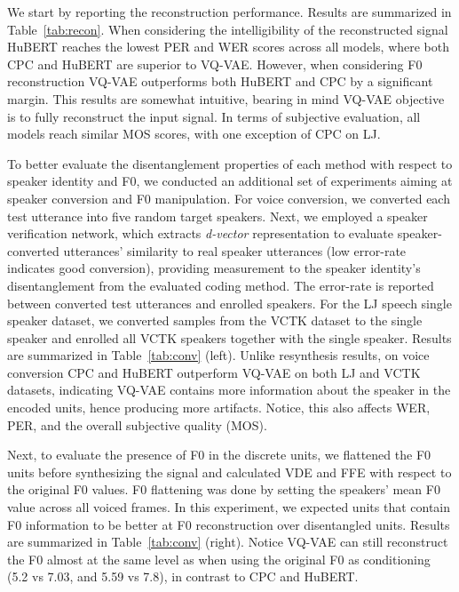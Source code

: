 {}
We start by reporting the reconstruction performance. Results are summarized in Table~\ref{tab:recon}. When considering the intelligibility of the reconstructed signal HuBERT reaches the lowest PER and WER scores across all models, where both CPC and HuBERT are superior to VQ-VAE. However, when considering F0 reconstruction VQ-VAE outperforms both HuBERT and CPC by a significant margin. This results are somewhat intuitive, bearing in mind VQ-VAE objective is to fully reconstruct the input signal. In terms of subjective evaluation, all models reach similar MOS scores, with one exception of CPC on LJ. 


To better evaluate the disentanglement properties of each method with respect to speaker identity and F0, we conducted an additional set of experiments aiming at speaker conversion and F0 manipulation. For voice conversion, we converted each test utterance into five random target speakers. Next, we employed a speaker verification network, which extracts \emph{d-vector} representation to evaluate speaker-converted utterances' similarity to real speaker utterances (low error-rate indicates good conversion), providing measurement to the speaker identity's disentanglement from the evaluated coding method. The error-rate is reported between converted test utterances and enrolled speakers. For the LJ speech single speaker dataset, we converted samples from the VCTK dataset to the single speaker and enrolled all VCTK speakers together with the single speaker. Results are summarized in Table~\ref{tab:conv} (left). Unlike resynthesis results, on voice conversion CPC and HuBERT outperform VQ-VAE on both LJ and VCTK datasets, indicating VQ-VAE contains more information about the speaker in the encoded units, hence producing more artifacts. Notice, this also affects WER, PER, and the overall subjective quality (MOS). 

Next, to evaluate the presence of F0 in the discrete units, we flattened the F0 units before synthesizing the signal and calculated VDE and FFE with respect to the original F0 values. F0 flattening was done by setting the speakers' mean F0 value across all voiced frames. In this experiment, we expected units that contain F0 information to be better at F0 reconstruction over disentangled units. Results are summarized in Table~\ref{tab:conv} (right). Notice VQ-VAE can still reconstruct the F0 almost at the same level as when using the original F0 as conditioning (5.2 vs 7.03, and 5.59 vs 7.8), in contrast to CPC and HuBERT.

